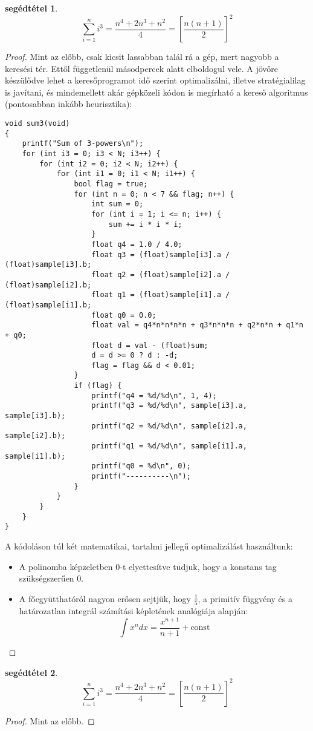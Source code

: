 \documentclass{article}
\newtheorem{lemm}{segédtétel}
\newcommand{\squareparenthesed}[1]{\left[#1\right]}
\newcommand{\parenthesed}[1]{\left(#1\right)}
\begin{document}
	\begin{lemm}
		\[
			\sum_{i=1}^n i^3 = \frac{n^4+2n^3+n^2}4 = \squareparenthesed{\frac{n\parenthesed{n+1}}2}^2
		\]
	\end{lemm}
	\begin{proof}
		Mint az előbb, csak kicsit lassabban talál rá a gép, mert nagyobb a keresési tér.
		Ettől függetlenül másodpercek alatt elboldogul vele.
		A jövőre készülődve lehet a keresőprogramot idő szerint optimalizálni, illetve stratégialilag is javítani, és mindemellett akár gépközeli kódon is megírható a kereső algoritmus (pontosabban inkább heurisztika):
		\begin{verbatim}
void sum3(void)
{
	printf("Sum of 3-powers\n");
	for (int i3 = 0; i3 < N; i3++) {
		for (int i2 = 0; i2 < N; i2++) {
			for (int i1 = 0; i1 < N; i1++) {
				bool flag = true;
				for (int n = 0; n < 7 && flag; n++) {
					int sum = 0;
					for (int i = 1; i <= n; i++) {
						sum += i * i * i;
					}
					float q4 = 1.0 / 4.0;
					float q3 = (float)sample[i3].a / (float)sample[i3].b;
					float q2 = (float)sample[i2].a / (float)sample[i2].b;
					float q1 = (float)sample[i1].a / (float)sample[i1].b;
					float q0 = 0.0;
					float val = q4*n*n*n*n + q3*n*n*n + q2*n*n + q1*n + q0;
					float d = val - (float)sum;
					d = d >= 0 ? d : -d;
					flag = flag && d < 0.01;
				}
				if (flag) {
					printf("q4 = %d/%d\n", 1, 4);
					printf("q3 = %d/%d\n", sample[i3].a, sample[i3].b);
					printf("q2 = %d/%d\n", sample[i2].a, sample[i2].b);
					printf("q1 = %d/%d\n", sample[i1].a, sample[i1].b);
					printf("q0 = %d\n", 0);
					printf("----------\n");
				}
			}
		}
	}
}
		\end{verbatim}
		A kódoláson túl két matematikai, tartalmi jellegű optimalizálást használtunk:
		\begin{itemize}
			\item A polinomba képzeletben 0-t elyettesítve tudjuk, hogy a konstans tag szükségszerűen 0.
			\item A főegyütthatóról nagyon erősen sejtjük, hogy $\frac15$, a primitív függvény és a határozatlan integrál számítási képletének analógiája alapján:
			\[\int x^n dx = \frac{x^{n+1}}{n+1} + \text{const}\]
		\end{itemize}
	\end{proof}

	\begin{lemm}
		\[
			\sum_{i=1}^n i^3 = \frac{n^4+2n^3+n^2}4 = \squareparenthesed{\frac{n\parenthesed{n+1}}2}^2
		\]
	\end{lemm}
	\begin{proof}
		Mint az előbb.
	\end{proof}
\end{document}
